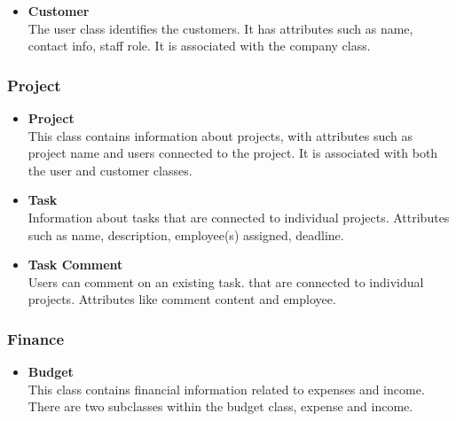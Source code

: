 \begin{itemize}
  \item \textbf{Customer} \\
  The user class identifies the customers. It has attributes such as name, contact info, staff role. It is associated with the company class.
\end{itemize}

\subsubsection*{Project}

\begin{itemize}
  \item \textbf{Project} \\
This class contains information about projects, with attributes such as project name and users connected to the project. It is associated with both the user and customer classes.
  \item \textbf{Task} \\
Information about tasks that are connected to individual projects. Attributes such as name, description, employee(s) assigned, deadline.
  \item \textbf{Task Comment} \\
Users can comment on an existing task. that are connected to individual projects. Attributes like comment content and employee.
\end{itemize}

\subsubsection*{Finance}

\begin{itemize}
  \item \textbf{Budget} \\
  This class contains financial information related to expenses and income.
  There are two subclasses within the budget class, expense and income. 
 

\end{itemize}

